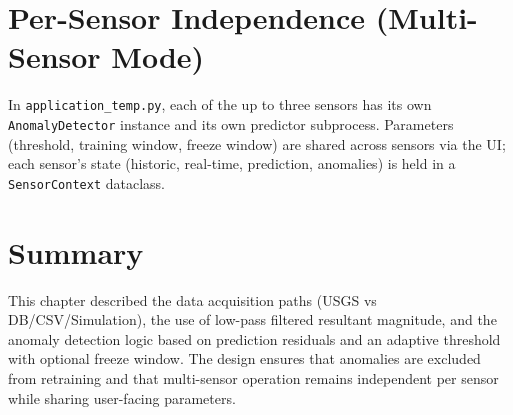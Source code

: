 \section{Per-Sensor Independence (Multi-Sensor Mode)}
In \texttt{application\_temp.py}, each of the up to three sensors has its own \texttt{AnomalyDetector} instance and its own predictor subprocess. Parameters (threshold, training window, freeze window) are shared across sensors via the UI; each sensor's state (historic, real-time, prediction, anomalies) is held in a \texttt{SensorContext} dataclass.

\section*{Summary}
This chapter described the data acquisition paths (USGS vs DB/CSV/Simulation), the use of low-pass filtered resultant magnitude, and the anomaly detection logic based on prediction residuals and an adaptive threshold with optional freeze window. The design ensures that anomalies are excluded from retraining and that multi-sensor operation remains independent per sensor while sharing user-facing parameters.
